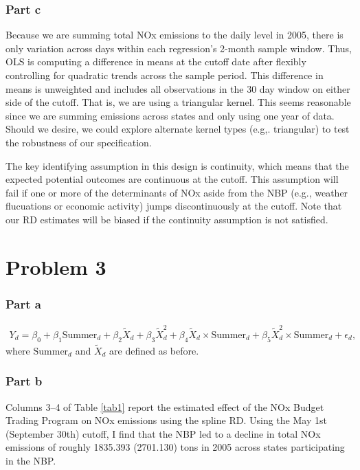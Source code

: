 \documentclass[12pt]{article}
\begin{document}
\subsubsection*{Part c}
Because we are summing total NOx emissions to the daily level in 2005, there is only variation across days within each regression's 2-month sample window. Thus, OLS is computing a difference in means at the cutoff date after flexibly controlling for quadratic trends across the sample period. This difference in means is unweighted and includes all observations in the 30 day window on either side of the cutoff. That is, we are using a triangular kernel. This seems reasonable since we are summing emissions across states and only using one year of data. Should we desire, we could explore alternate kernel types (e.g,. triangular) to test the robustness of our specification.

The key identifying assumption in this design is continuity, which means that the expected potential outcomes are continuous at the cutoff. This assumption will fail if one or more of the determinants of NOx aside from the NBP (e.g., weather flucuations or economic activity) jumps discontinuously at the cutoff. Note that our RD estimates will be biased if the continuity assumption is not satisfied.

\section*{Problem 3}

\subsubsection*{Part a}

\begin{align}
	Y_d = \beta_0 + \beta_1 \text{Summer}_d + \beta_2 \tilde{X}_d + \beta_3 \tilde{X}_d^2 + \beta_4 \tilde{X}_d \times 
		\text{Summer}_d + \beta_5 \tilde{X}_d^2 \times \text{Summer}_d + \epsilon_d,
\end{align}
where $\text{Summer}_d$ and $ \tilde{X}_d$ are defined as before.

\subsubsection*{Part b}
Columns 3--4 of Table \ref{tab1} report the estimated effect of the NOx Budget Trading Program on NOx emissions using the spline RD. Using the May 1st (September 30th) cutoff, I find that the NBP led to a decline in total NOx emissions of roughly 1835.393 (2701.130) tons in 2005 across states participating in the NBP.
\end{document}
